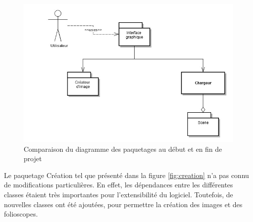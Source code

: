 \begin{figure}[h]
		\centering
		\includegraphics[scale=0.4]{diag_packages.jpg}
		\caption{\label{fig:archi} Comparaison du diagramme des paquetages au début et en fin de projet \protect \footnotemark}
\end{figure}


Le paquetage Création tel que présenté dans la figure \ref{fig:creation} n'a pas connu de modifications particulières. En effet, les dépendances entre les différentes classes étaient très importantes pour l'extensibilité du logiciel. Toutefois, de nouvelles classes ont été ajoutées, pour permettre la création des images et des folioscopes.

